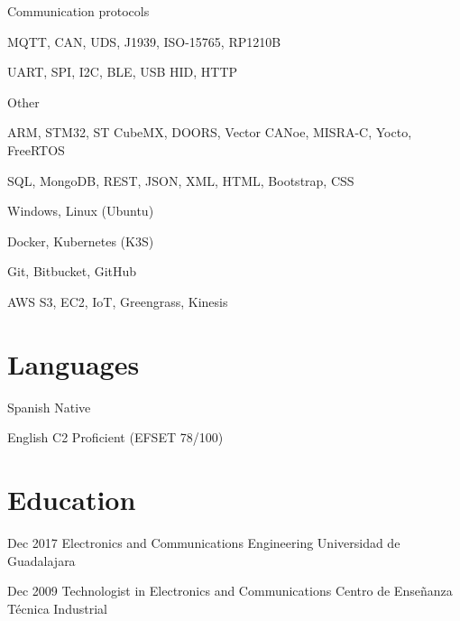 \documentclass{resume} %
\begin{document}
\skillgroup
    {Communication protocols}
    {
    \begin{itemize-bullets}
        \item{MQTT, CAN, UDS, J1939, ISO-15765, RP1210B}
        \item{UART, SPI, I2C, BLE, USB HID, HTTP}
        \end{itemize-bullets}
    }


\skillgroup
    {Other}
    {
    \begin{itemize-bullets}
        \item{ARM, STM32, ST CubeMX, DOORS, Vector CANoe, MISRA-C, Yocto, FreeRTOS}
        \item{SQL, MongoDB, REST, JSON, XML, HTML, Bootstrap, CSS}
        \item{Windows, Linux (Ubuntu)}
        \item{Docker, Kubernetes (K3S)}
        \item{Git, Bitbucket, GitHub}
        \item{AWS S3, EC2, IoT, Greengrass, Kinesis}
        \end{itemize-bullets}
    }




\section{Languages}


\langitem
    {Spanish}
    {Native}


\langitem
    {English}
    {C2 Proficient (EFSET 78/100)}




\section{Education}


\eduitem
    {Dec 2017}
    {Electronics and Communications Engineering}
    {Universidad de Guadalajara}


\eduitem
    {Dec 2009}
    {Technologist in Electronics and Communications}
    {Centro de Enseñanza Técnica Industrial}


\end{document}

